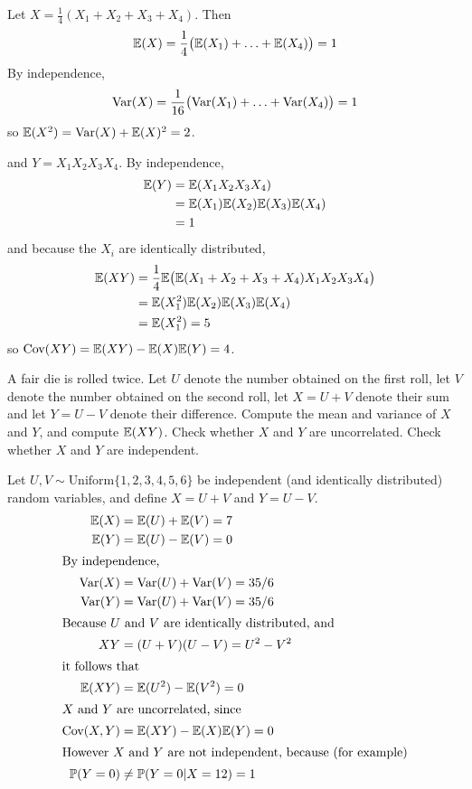 \begin{exercise}
\begin{questions}
\begin{answer}
Let $X=\frac{1}{4}(X_1+X_2+X_3+X_4)$. Then
\[
\mathbb{E}(X) 	= \frac{1}{4}\big(\mathbb{E}(X_1)+\ldots+\mathbb{E}(X_4)\big) = 1
\]
By independence,
\[
\text{Var}(X) 	= \frac{1}{16}\big(\text{Var}(X_1)+\ldots+\text{Var}(X_4)\big) = 1 
\]
so $\mathbb{E}(X^2)	= \text{Var}(X) + \mathbb{E}(X)^2 = 2$.

and $Y=X_1 X_2 X_3 X_4$. By independence,
\begin{align*}
\mathbb{E}(Y) 
	& = \mathbb{E}(X_1 X_2 X_3 X_4) \\
	& = \mathbb{E}(X_1)\mathbb{E}(X_2)\mathbb{E}(X_3)\mathbb{E}(X_4) \\
	& = 1 \\
\end{align*}
and because the $X_i$ are identically distributed,
\begin{align*}
\mathbb{E}(XY) 
	& = \frac{1}{4}\mathbb{E}\big(\mathbb{E}(X_1+X_2+X_3+X_4)X_1X_2X_3X_4\big) \\
	& = \mathbb{E}(X_1^2)\mathbb{E}(X_2)\mathbb{E}(X_3)\mathbb{E}(X_4) \\
	& = \mathbb{E}(X_1^2) = 5 \\
\end{align*}
so $\text{Cov}(XY) = \mathbb{E}(XY) - \mathbb{E}(X)\mathbb{E}(Y) = 4$.
\end{answer} 

\question
A fair die is rolled twice. Let $U$ denote the number obtained on the first roll, let $V$ denote the number obtained on the second roll, let $X=U+V$ denote their sum and let $Y=U-V$ denote their difference. Compute the mean and variance of $X$ and $Y$, and compute $\mathbb{E}(XY)$. Check whether $X$ and $Y$ are uncorrelated. Check whether $X$ and $Y$ are independent.
\begin{answer}
Let $U,V\sim\text{Uniform}\{1,2,3,4,5,6\}$ be independent (and identically distributed) random variables, and define $X=U+V$ and $Y=U-V$. 
\begin{align*}
\mathbb{E}(X)	& = \mathbb{E}(U) + \mathbb{E}(V) = 7 \\
\mathbb{E}(Y)	& = \mathbb{E}(U) - \mathbb{E}(V) = 0 \\
\intertext{By independence,}
\text{Var}(X)		& = \text{Var}(U) + \text{Var}(V) = 35/6 \\
\text{Var}(Y)		& = \text{Var}(U) + \text{Var}(V) = 35/6 \\
\intertext{Because $U$ and $V$ are identically distributed, and}
XY 			& = (U+V)(U-V) = U^2 - V^2 \\
\intertext{it follows that}
\mathbb{E}(XY)	& = \mathbb{E}(U^2) - \mathbb{E}(V^2) = 0 \\
\intertext{$X$ and $Y$ are uncorrelated, since}
\text{Cov}(X,Y)	& = \mathbb{E}(XY) - \mathbb{E}(X)\mathbb{E}(Y) =0 \\
\intertext{However $X$ and $Y$ are not independent, because (for example)}
\mathbb{P}(Y=0)		& \neq \mathbb{P}(Y=0|X=12)=1
\end{align*}
\end{answer} 



\end{questions}
\end{exercise}

\endinput
